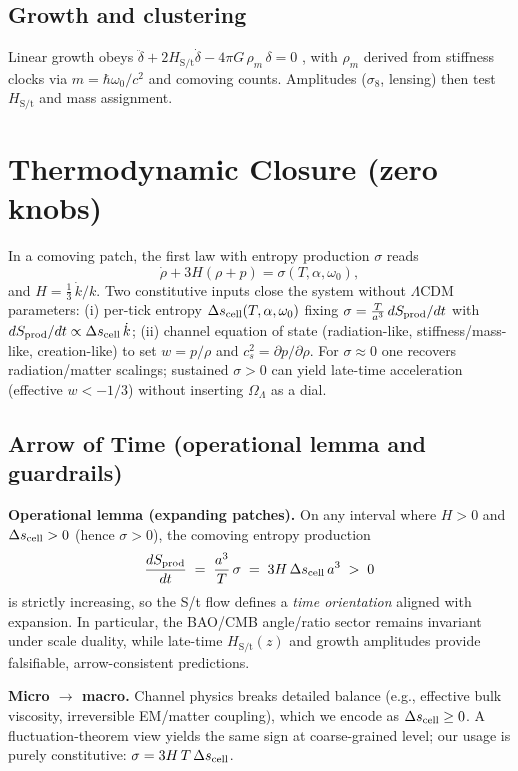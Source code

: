 \documentclass[11pt,oneside]{article}
\begin{document}
\subsection{Growth and clustering}
Linear growth obeys $\ddot\delta+2H_{\text{S/t}}\dot\delta-4\pi G\,\rho_m\,\delta=0$ \cite{dodelson2003}, with $\rho_m$ derived from stiffness clocks via
$m=\hbar\omega_0/c^2$ and comoving counts. Amplitudes ($\sigma_8$, lensing) then test $H_{\text{S/t}}$ and mass assignment.

\section{Thermodynamic Closure (zero knobs)}
In a comoving patch, the first law with entropy production $\sigma$ reads
\begin{equation*}
\dot\rho + 3H(\rho+p) = \sigma(T,\alpha,\omega_0),
\end{equation*}
and $H=\tfrac13\,\dot k/k$. Two constitutive inputs close the system without $\Lambda$CDM parameters:
(i) per-tick entropy $\Delta s_{\rm cell}(T,\alpha,\omega_0)$ fixing $\sigma=\tfrac{T}{a^3}\,dS_{\rm prod}/dt$ with $dS_{\rm prod}/dt\propto \Delta s_{\rm cell}\,\dot k$;
(ii) channel equation of state (radiation-like, stiffness/mass-like, creation-like) to set $w=p/\rho$ and $c_s^2=\partial p/\partial\rho$.
For $\sigma\!\approx\!0$ one recovers radiation/matter scalings; sustained $\sigma>0$ can yield late-time acceleration (effective $w<-1/3$)
without inserting $\Omega_{\Lambda}$ as a dial.

\subsection*{Arrow of Time (operational lemma and guardrails)}
\noindent\textbf{Operational lemma (expanding patches).}
On any interval where $H>0$ and $\Delta s_{\rm cell}>0$ (hence $\sigma>0$), the comoving entropy production
\[
\frac{dS_{\rm prod}}{dt} \;=\; \frac{a^3}{T}\,\sigma \;=\; 3H\,\Delta s_{\rm cell}\,a^3 \;>\; 0
\]
is strictly increasing, so the S/t flow defines a \emph{time orientation} aligned with expansion. In particular, the BAO/CMB angle/ratio sector remains invariant under scale duality, while late-time $H_{\text{S/t}}(z)$ and growth amplitudes provide falsifiable, arrow-consistent predictions.

\medskip
\noindent\textbf{Micro $\to$ macro.}
Channel physics breaks detailed balance (e.g., effective bulk viscosity, irreversible EM/matter coupling), which we encode as $\Delta s_{\rm cell}\ge 0$. A fluctuation-theorem view yields the same sign at coarse-grained level; our usage is purely constitutive: $\sigma=3H\,T\,\Delta s_{\rm cell}$.
\end{document}
